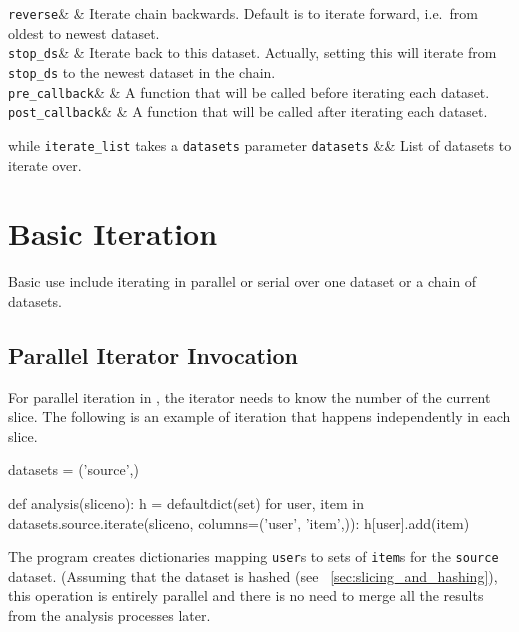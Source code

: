   \RP \texttt{reverse}& \pyFalse & Iterate chain
  backwards.  Default is to iterate forward, i.e.\ from oldest to
  newest dataset.\\[1ex]

  \RP \texttt{stop\_ds}& \pyNone & Iterate back to this dataset.  Actually, setting
  this will iterate from \texttt{stop\_ds} to the newest dataset in the chain.\\[1ex]

  \RP \texttt{pre\_callback}& \pyNone & A function that will be called before
  iterating each dataset.\\[1ex]

  \RP \texttt{post\_callback}& \pyNone & A function that will be called after
  iterating each dataset.\\
\stoptable

\noindent while \texttt{iterate\_list} takes a \texttt{datasets} parameter
\starttable
  \RP \texttt{datasets} &\pyNone& List of datasets to iterate over.
\stoptable



\section{Basic Iteration}
Basic use include iterating in parallel or serial over one dataset or
a chain of datasets.



\subsection*{Parallel Iterator Invocation}
For parallel iteration in \analysis, the iterator needs to know the
number of the current slice.  The following is an example of iteration
that happens independently in each slice.

\begin{python}
datasets = ('source',)

def analysis(sliceno):
    h = defaultdict(set)
    for user, item in datasets.source.iterate(sliceno,
                                              columns=('user', 'item',)):
        h[user].add(item)
\end{python}
The program creates dictionaries mapping \texttt{user}s to sets of
\texttt{item}s for the \texttt{source} dataset.  (Assuming that
the dataset is hashed (see ~\ref{sec:slicing_and_hashing}), this operation is entirely parallel
and there is no need to merge all the results from the analysis
processes later.



